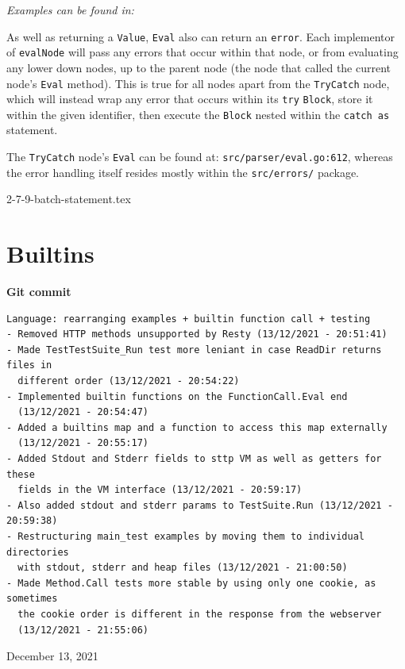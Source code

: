 \documentclass[]{full}
\theoremstyle{definition}
\begin{document}
\textit{Examples can be found in: }

As well as returning a \verb|Value|, \verb|Eval| also can return an \texttt{error}. Each implementor of \verb|evalNode| will pass any errors that occur within that node, or from evaluating any lower down nodes, up to the parent node (the node that called the current node's \verb|Eval| method). This is true for all nodes apart from the \verb|TryCatch| node, which will instead wrap any error that occurs within its \verb|try| \verb|Block|, store it within the given identifier, then execute the \verb|Block| nested within the \verb|catch as| statement.

The \verb|TryCatch| node's \verb|Eval| can be found at: \verb|src/parser/eval.go:612|, whereas the error handling itself resides mostly within the \verb|src/errors/| package.

{2-7-9-batch-statement.tex}

\section{Builtins}
\label{sec:development-builtins}

\begin{center}
    \textbf{Git commit}
    \begin{verbatim}
Language: rearranging examples + builtin function call + testing
- Removed HTTP methods unsupported by Resty (13/12/2021 - 20:51:41)
- Made TestTestSuite_Run test more leniant in case ReadDir returns files in
  different order (13/12/2021 - 20:54:22)
- Implemented builtin functions on the FunctionCall.Eval end
  (13/12/2021 - 20:54:47)
- Added a builtins map and a function to access this map externally
  (13/12/2021 - 20:55:17)
- Added Stdout and Stderr fields to sttp VM as well as getters for these
  fields in the VM interface (13/12/2021 - 20:59:17)
- Also added stdout and stderr params to TestSuite.Run (13/12/2021 - 20:59:38)
- Restructuring main_test examples by moving them to individual directories
  with stdout, stderr and heap files (13/12/2021 - 21:00:50)
- Made Method.Call tests more stable by using only one cookie, as sometimes
  the cookie order is different in the response from the webserver
  (13/12/2021 - 21:55:06)
    \end{verbatim}
    \vspace{-1em}
    \tiny{December 13, 2021}
\end{center}
\end{document}
